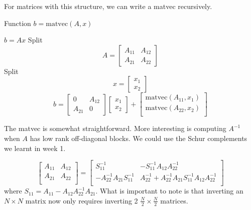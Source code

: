 For matrices with this structure, we can write a matvec recursively.
\begin{algorithm}
    \caption{Function $b=\text{matvec}(A, x)$}
    \begin{algorithmic}
            \STATE $b = Ax$
        \ELSE
            \STATE Split \begin{equation*}
                A = \begin{bmatrix}
                    A_{11} & A_{12}\\
                    A_{21} & A_{22}
            \end{bmatrix}
        \end{equation*}
            \STATE Split \begin{equation*}
            x = \begin{bmatrix}
                x_1 \\
                x_2
            \end{bmatrix}
        \end{equation*}
        \STATE
        \begin{equation*}
            b =
            \begin{bmatrix}
                0 & A_{12} \\
                A_{21} & 0
            \end{bmatrix}
            \begin{bmatrix}
                x_1 \\
                x_2
            \end{bmatrix}
            +
            \begin{bmatrix}
                \text{matvec}(A_{11},x_1) \\
                \text{matvec}(A_{22},x_2) \\
            \end{bmatrix}
        \end{equation*}
        \ENDIF
    \end{algorithmic}
\end{algorithm}

The matvec is somewhat straightforward. More interesting is computing $A^{-1}$ when $A$ has low rank off-diagonal blocks. We could use the Schur complements we learnt in week 1.

\begin{equation*}
    \begin{bmatrix}
        A_{11} & A_{12}\\
        A_{21} & A_{22}\\
    \end{bmatrix}
    =
    \begin{bmatrix}
        S_{11}^{-1} & -S_{11}^{-1}A_{12}A_{22}^{-1}\\
        -A_{22}^{-1}A_{21}S_{11}^{-1} &
        A_{22}^{-1}+A_{22}^{-1}A_{21}S_{11}^{-1}
        A_{12}A_{22}^{-1}\\
    \end{bmatrix}
\end{equation*}
where $S_{11} = A_{11}-A_{12}A_{22}^{-1}A_{21}$. What is important to note is that inverting an $N\times N$ matrix now only requires inverting 2 $\frac{N}{2} \times \frac{N}{2}$ matrices.

